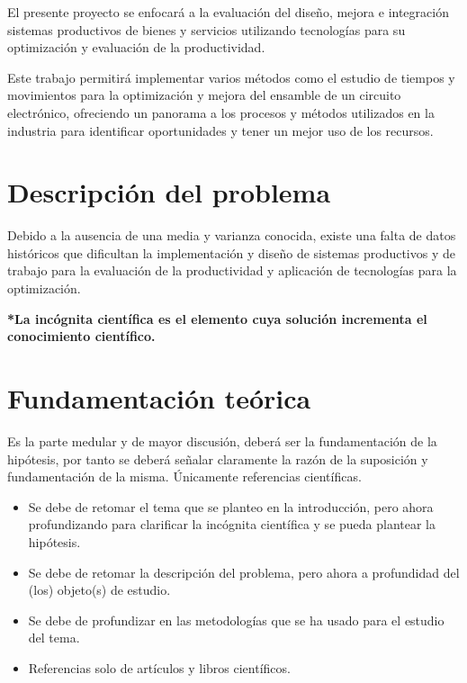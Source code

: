     
    El presente proyecto se enfocará a la evaluación del diseño, mejora e integración sistemas productivos de bienes y servicios utilizando tecnologías para su optimización y evaluación de la productividad. 
    
    Este trabajo permitirá implementar varios métodos como el estudio de tiempos y movimientos para la optimización y mejora del ensamble de un circuito electrónico, ofreciendo un panorama a los procesos y métodos utilizados en la industria para identificar oportunidades y tener un mejor uso de los recursos. 
    
    \section{Descripción del problema}
    
    
    Debido a la ausencia de una media y varianza conocida, existe una falta de datos históricos que dificultan la implementación y diseño de sistemas productivos y de trabajo para la evaluación de la productividad y aplicación de tecnologías para la optimización.
    
    
    \textbf{*La incógnita científica es el elemento cuya solución incrementa el conocimiento científico.}
    \section{Fundamentación teórica}
    
    Es la parte medular y de mayor discusión, deberá ser la fundamentación de la hipótesis, por tanto se deberá señalar claramente la razón de la suposición y fundamentación de la misma. Únicamente referencias científicas.
    \begin{itemize}
        \item Se debe de retomar el tema que se planteo en la introducción, pero ahora profundizando para clarificar la incógnita científica y se pueda plantear la hipótesis.
        \item Se debe de retomar la descripción del problema, pero ahora a profundidad del (los) objeto(s) de estudio. 
        \item Se debe de profundizar en las metodologías que se ha usado para el estudio del tema.
        \item Referencias solo de artículos y libros científicos.
    \end{itemize}
